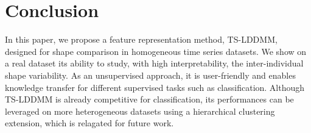 


        
    





\section{Conclusion}
In this paper, we propose a feature representation method, TS-LDDMM, designed for 
shape comparison in homogeneous time series datasets. We show on a real dataset 
its ability to study, with high interpretability, the inter-individual shape 
variability. As an unsupervised approach, it is user-friendly and enables knowledge 
transfer for different supervised tasks such as classification. Although TS-LDDMM 
is already competitive for classification, its performances can be leveraged on 
more heterogeneous datasets using a hierarchical clustering extension, which is relagated for future work. 

